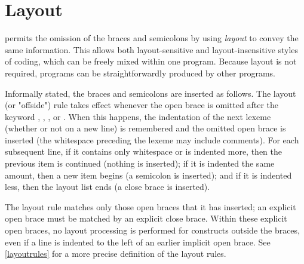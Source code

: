 \section{Layout} \label{layout}

\frege{} permits the omission of the braces and semicolons by using \emph{layout} to convey the same information.
This allows both layout-sensitive and layout-insensitive styles of coding, which can be freely mixed within one program.
Because layout is not required, \frege{} programs can be straightforwardly produced by other programs.

Informally stated, the braces and semicolons are inserted as follows.
The layout (or "offside") rule takes effect whenever the open brace is omitted after the keyword , , , or .
When this happens, the indentation of the next lexeme (whether or not on a new line) is remembered and the omitted open brace is inserted (the whitespace preceding the lexeme may include comments).
For each subsequent line, if it contains only whitespace or is indented more, then the previous item is continued (nothing is inserted);
if it is indented the same amount, then a new item begins (a semicolon is inserted);
and if it is indented less, then the layout list ends (a close brace is inserted).

The layout rule matches only those open braces that it has inserted; an explicit open brace must be matched by an explicit close brace.
Within these explicit open braces, no layout processing is performed for constructs outside the braces, even if a line is indented to the left of an earlier implicit open brace.
See \autoref{layoutrules} for a more precise definition of the layout rules.

